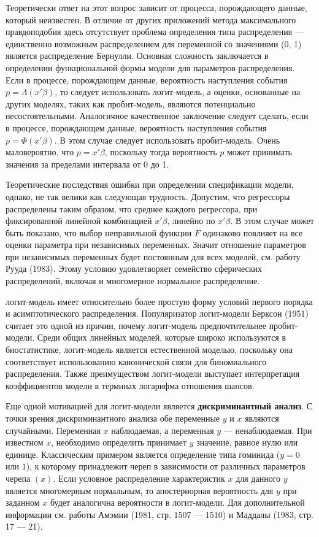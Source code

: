 Теоретически ответ на этот вопрос зависит от процесса, порождающего данные,  который неизвестен. В отличие от других приложений метода максимального правдоподобия здесь отсутствует проблема определения типа распределения --- единственно возможным распределением для переменной со значениями (0, 1) является распределение Бернулли. Основная сложность заключается в определении функциональной формы модели для параметров распределения. Если в процессе, порождающем данные, вероятность наступления события $p=\Lambda (x'\beta )$,  то следует использовать логит-модель,  а оценки,  основанные на других моделях,  таких как пробит-модель,  являются потенциально несостоятельными. Аналогичное качественное заключение следует сделать,  если в процессе, порождающем данные, вероятность наступления события $p=\Phi (x'\beta )$. В этом случае следует использовать пробит-модель. Очень маловероятно,  что $p=x'\beta $,  поскольку тогда вероятность  $p$ может принимать значения за пределами интервала от 0 до 1.

Теоретические последствия ошибки при определении спецификации модели,  однако,  не так велики как следующая трудность. Допустим, что регрессоры распределены таким образом,  что среднее каждого регрессора,  при фиксированной линейной комбинацией $x'\beta $,  линейно по $x'\beta $.  В этом случае  может быть показано,  что  выбор неправильной функции $F$ одинаково повлияет на все оценки параметра при независимых переменных.  Значит отношение параметров при независимых переменных будет постоянным для всех моделей, см. работу Рууда (1983). Этому условию удовлетворяет семейство сферических распределений,  включая и многомерное нормальное распределение.

логит-модель имеет относительно более простую форму условий первого порядка и асимптотического распределения. Популяризатор логит-модели Берксон  (1951)  считает это одной из причин, почему логит-модель предпочтительнее  пробит-модели. Среди  общих линейных моделей,  которые широко используются в биостатистике,  логит-модель является естественной моделью,  поскольку она соответствует использованию канонической связи для биномиального распределения. Также преимуществом логит-модели выступает интерпретация коэффициентов модели в терминах логарифма отношения шансов.

Еще одной мотивацией для логит-модели является \textbf{дискриминантный анализ}. С точки зрения дискриминантного анализа обе переменные $y$ и $x$ являются случайными. Переменная $x$ наблюдаемая,  а переменная $y$ --- ненаблюдаемая. При известном $x$,  необходимо определить принимает $y$ значение,  равное нулю или единице. Классическим примером является определение типа  гоминида ($y=0$ или $1$),  к которому принадлежит череп в зависимости от различных параметров черепа $(x)$. Если условное распределение характеристик $x$ для данного $y$ является многомерным нормальным,  то апостериорная  вероятность для $y$ при заданном $x$ будет аналогична вероятности в логит-модели. Для дополнительной информации см. работы Амэмии (1981,  стр. 1507 --- 1510) и Маддалы (1983,  стр.  17 --- 21).

